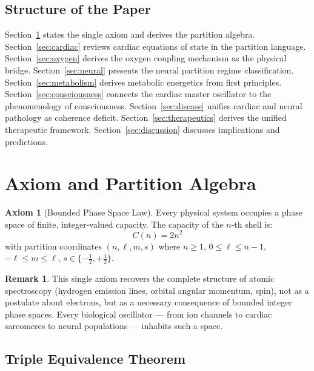 \documentclass[10pt,twocolumn,a4paper]{article}
\theoremstyle{definition}
\newtheorem{axiom}{Axiom}
\newtheorem{remark}{Remark}
\begin{document}
\subsection{Structure of the Paper}

Section~\ref{sec:axiom} states the single axiom and derives the partition algebra.
Section~\ref{sec:cardiac} reviews cardiac equations of state in the partition language.
Section~\ref{sec:oxygen} derives the oxygen coupling mechanism as the physical bridge.
Section~\ref{sec:neural} presents the neural partition regime classification.
Section~\ref{sec:metabolism} derives metabolic energetics from first principles.
Section~\ref{sec:consciousness} connects the cardiac master oscillator to the
phenomenology of consciousness.
Section~\ref{sec:disease} unifies cardiac and neural pathology as coherence deficit.
Section~\ref{sec:therapeutics} derives the unified therapeutic framework.
Section~\ref{sec:discussion} discusses implications and predictions.

\section{Axiom and Partition Algebra}
\label{sec:axiom}

\begin{axiom}[Bounded Phase Space Law]
\label{ax:bpsl}
Every physical system occupies a phase space of finite, integer-valued capacity.
The capacity of the $n$-th shell is:
\begin{equation}
\boxed{C(n) = 2n^2}
\end{equation}
with partition coordinates $(n, \ell, m, s)$ where $n \geq 1$,
$0 \leq \ell \leq n-1$, $-\ell \leq m \leq \ell$, $s \in \{-\tfrac{1}{2}, +\tfrac{1}{2}\}$.
\end{axiom}

\begin{remark}
This single axiom recovers the complete structure of atomic spectroscopy
(hydrogen emission lines, orbital angular momentum, spin), not as a
postulate about electrons, but as a necessary consequence of bounded integer
phase spaces. Every biological oscillator — from ion channels to cardiac
sarcomeres to neural populations — inhabits such a space.
\end{remark}

\subsection{Triple Equivalence Theorem}
\end{document}
